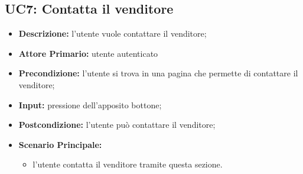         \subsection{UC7: Contatta il venditore}
        \label{sec:UC7}
        \begin{itemize}
            \item \textbf{Descrizione:} l'utente vuole contattare il venditore;
            \item \textbf{Attore Primario:} utente autenticato
            \item \textbf{Precondizione:} l'utente si trova in una pagina che permette di contattare il venditore;
            \item \textbf{Input:} pressione dell'apposito bottone;
            \item \textbf{Postcondizione:} l'utente può contattare il venditore;
            \item \textbf{Scenario Principale:}
            \begin{itemize}
                \item l'utente contatta il venditore tramite questa sezione.
            \end{itemize}
        \end{itemize}
